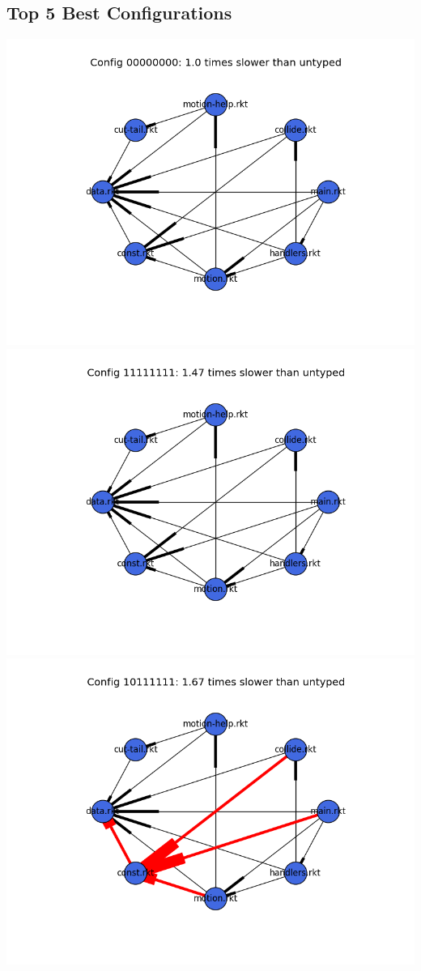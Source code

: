 \documentclass{article}
\begin{document}
\begin{itemize}
\subsection{Top 5 Best Configurations}
\includegraphics[width=\textwidth]{snake-2015-04-10-module-graph-00000000.png}
\includegraphics[width=\textwidth]{snake-2015-04-10-module-graph-11111111.png}
\includegraphics[width=\textwidth]{snake-2015-04-10-module-graph-10111111.png}

\end{itemize}
\end{document}
